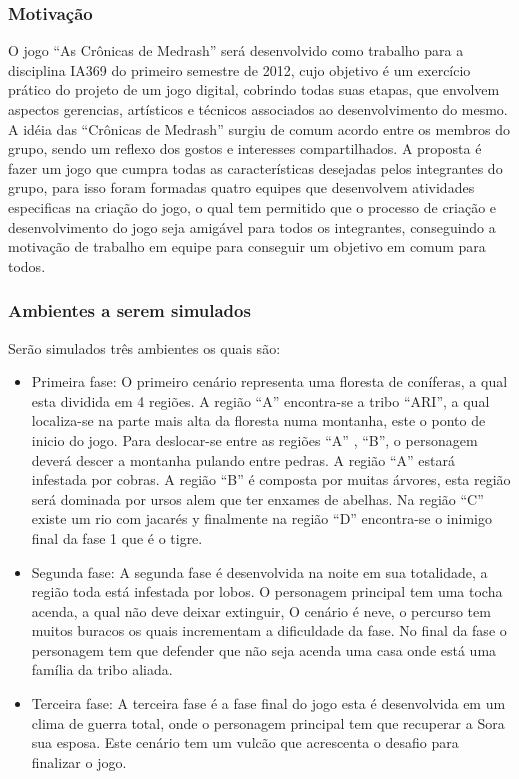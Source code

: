 \subsubsection{Motivação}

O jogo ``As Crônicas de Medrash'' será desenvolvido como trabalho para
 a disciplina IA369 do primeiro semestre de 2012, cujo objetivo é um exercício 
prático do projeto de um jogo digital, cobrindo todas suas etapas, que envolvem 
aspectos gerencias, artísticos e técnicos associados ao desenvolvimento do mesmo.
A idéia das ``Crônicas de Medrash'' surgiu de comum acordo entre os membros
 do grupo, sendo um reflexo dos gostos e interesses compartilhados. A proposta 
é fazer um jogo que cumpra todas as características desejadas pelos integrantes 
do grupo, para isso foram formadas quatro equipes que desenvolvem atividades 
especificas na criação do jogo, o qual tem permitido que o processo de criação e 
desenvolvimento do jogo seja amigável para todos os integrantes, conseguindo 
a motivação de trabalho em equipe para conseguir um objetivo em comum para todos.

\subsubsection{Ambientes a serem simulados}
Serão simulados três ambientes os quais são:

\begin{itemize}
\item Primeira fase: 
O primeiro cenário representa uma floresta de coníferas, a qual esta dividida em 
4 regiões. A região ``A'' encontra-se a tribo ``ARI'', a qual localiza-se na parte mais alta
 da floresta numa montanha, este o ponto de inicio do jogo. Para deslocar-se entre
 as regiões ``A'' , ``B'', o personagem deverá descer a montanha pulando entre pedras.
 A região ``A'' estará infestada por cobras. A região ``B'' é composta por muitas árvores,
 esta região será dominada por ursos alem que ter enxames de abelhas. Na região ``C'' 
existe um rio com jacarés y finalmente na região ``D'' encontra-se o inimigo final da fase 1 
que é o tigre.

\item Segunda fase: 
A segunda fase é desenvolvida na noite em sua totalidade, a região toda está infestada 
por lobos. O personagem principal tem uma tocha acenda, a qual não deve deixar
 extinguir, O cenário é neve, o percurso tem muitos buracos os quais incrementam 
a dificuldade da fase. No final da fase o personagem tem que defender que não seja
 acenda uma casa onde está uma família da tribo aliada.

\item Terceira fase: 
A terceira fase é a fase final do jogo esta é desenvolvida em um clima de guerra total,
 onde o personagem principal tem que recuperar a Sora sua esposa. Este cenário tem 
um vulcão que acrescenta o desafio para finalizar o jogo. 
\end{itemize}


